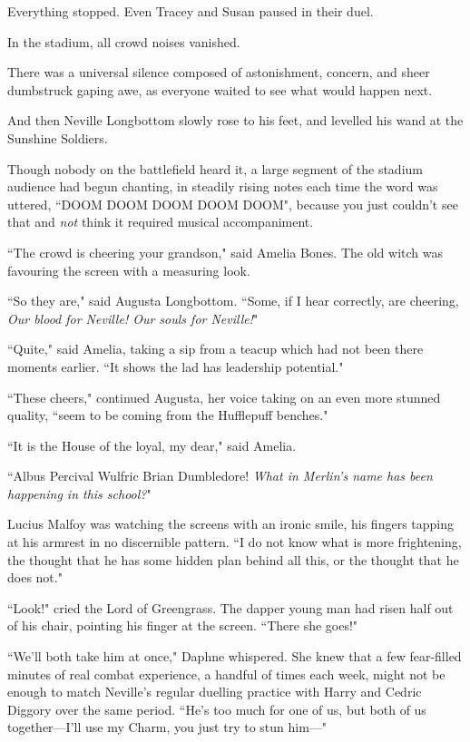 Everything stopped. Even Tracey and Susan paused in their duel.

In the stadium, all crowd noises vanished.

There was a universal silence composed of astonishment, concern, and sheer dumbstruck gaping awe, as everyone waited to see what would happen next.

And then Neville Longbottom slowly rose to his feet, and levelled his wand at the Sunshine Soldiers.

Though nobody on the battlefield heard it, a large segment of the stadium audience had begun chanting, in steadily rising notes each time the word was uttered, ``DOOM DOOM DOOM DOOM DOOM", because you just couldn't see that and \emph{not} think it required musical accompaniment.

``The crowd is cheering your grandson," said Amelia Bones. The old witch was favouring the screen with a measuring look.

``So they are," said Augusta Longbottom. ``Some, if I hear correctly, are cheering, \emph{Our blood for Neville! Our souls for Neville!}"

``Quite," said Amelia, taking a sip from a teacup which had not been there moments earlier. ``It shows the lad has leadership potential."

``These cheers," continued Augusta, her voice taking on an even more stunned quality, ``seem to be coming from the Hufflepuff benches."

``It is the House of the loyal, my dear," said Amelia.

``Albus Percival Wulfric Brian Dumbledore! \emph{What in Merlin's name has been happening in this school?}"

Lucius Malfoy was watching the screens with an ironic smile, his fingers tapping at his armrest in no discernible pattern. ``I do not know what is more frightening, the thought that he has some hidden plan behind all this, or the thought that he does not."

``Look!" cried the Lord of Greengrass. The dapper young man had risen half out of his chair, pointing his finger at the screen. ``There she goes!"

\later

``We'll both take him at once," Daphne whispered. She knew that a few fear-filled minutes of real combat experience, a handful of times each week, might not be enough to match Neville's regular duelling practice with Harry and Cedric Diggory over the same period. ``He's too much for one of us, but both of us together—I'll use my Charm, you just try to stun him—"

